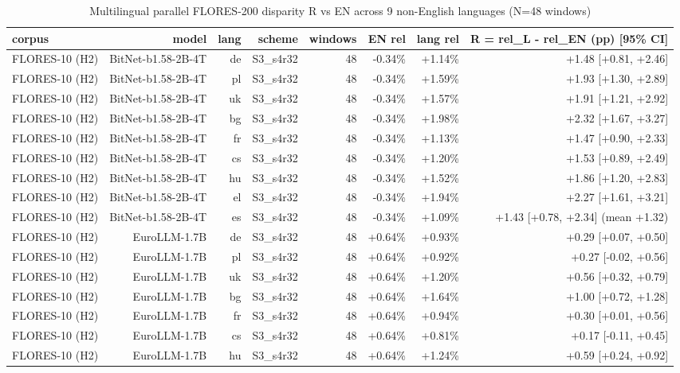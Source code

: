 \begin{table}[t]\centering\small
\caption{Multilingual parallel FLORES-200 disparity R vs EN across 9 non-English languages (N=48 windows)}
\begin{tabular}{lrrrrrrr}\toprule
corpus & model & lang & scheme & windows & EN rel & lang rel & R = rel\_L - rel\_EN (pp) [95\% CI] \\ \midrule
FLORES-10 (H2) & BitNet-b1.58-2B-4T & de & S3\_s4r32 & 48 & -0.34\% & +1.14\% & +1.48 [+0.81, +2.46] \\
FLORES-10 (H2) & BitNet-b1.58-2B-4T & pl & S3\_s4r32 & 48 & -0.34\% & +1.59\% & +1.93 [+1.30, +2.89] \\
FLORES-10 (H2) & BitNet-b1.58-2B-4T & uk & S3\_s4r32 & 48 & -0.34\% & +1.57\% & +1.91 [+1.21, +2.92] \\
FLORES-10 (H2) & BitNet-b1.58-2B-4T & bg & S3\_s4r32 & 48 & -0.34\% & +1.98\% & +2.32 [+1.67, +3.27] \\
FLORES-10 (H2) & BitNet-b1.58-2B-4T & fr & S3\_s4r32 & 48 & -0.34\% & +1.13\% & +1.47 [+0.90, +2.33] \\
FLORES-10 (H2) & BitNet-b1.58-2B-4T & cs & S3\_s4r32 & 48 & -0.34\% & +1.20\% & +1.53 [+0.89, +2.49] \\
FLORES-10 (H2) & BitNet-b1.58-2B-4T & hu & S3\_s4r32 & 48 & -0.34\% & +1.52\% & +1.86 [+1.20, +2.83] \\
FLORES-10 (H2) & BitNet-b1.58-2B-4T & el & S3\_s4r32 & 48 & -0.34\% & +1.94\% & +2.27 [+1.61, +3.21] \\
FLORES-10 (H2) & BitNet-b1.58-2B-4T & es & S3\_s4r32 & 48 & -0.34\% & +1.09\% & +1.43 [+0.78, +2.34] (mean +1.32) \\
FLORES-10 (H2) & EuroLLM-1.7B & de & S3\_s4r32 & 48 & +0.64\% & +0.93\% & +0.29 [+0.07, +0.50] \\
FLORES-10 (H2) & EuroLLM-1.7B & pl & S3\_s4r32 & 48 & +0.64\% & +0.92\% & +0.27 [-0.02, +0.56] \\
FLORES-10 (H2) & EuroLLM-1.7B & uk & S3\_s4r32 & 48 & +0.64\% & +1.20\% & +0.56 [+0.32, +0.79] \\
FLORES-10 (H2) & EuroLLM-1.7B & bg & S3\_s4r32 & 48 & +0.64\% & +1.64\% & +1.00 [+0.72, +1.28] \\
FLORES-10 (H2) & EuroLLM-1.7B & fr & S3\_s4r32 & 48 & +0.64\% & +0.94\% & +0.30 [+0.01, +0.56] \\
FLORES-10 (H2) & EuroLLM-1.7B & cs & S3\_s4r32 & 48 & +0.64\% & +0.81\% & +0.17 [-0.11, +0.45] \\
FLORES-10 (H2) & EuroLLM-1.7B & hu & S3\_s4r32 & 48 & +0.64\% & +1.24\% & +0.59 [+0.24, +0.92] \\

\end{tabular}
\end{table}
